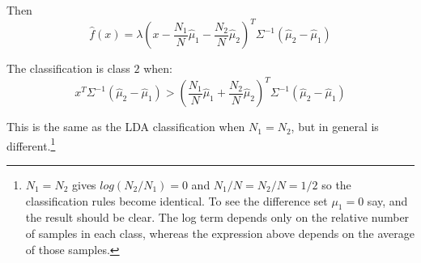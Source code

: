 Then $$\hat{f}(x) = \lambda \left(x -\frac{N_1}{N} \hat{\mu}_1 - \frac{N_2}{N} \hat{\mu}_2\right)^T \Sigma^{-1} \left(\hat{\mu}_2 - \hat{\mu}_1 \right)$$

The classification is class $2$ when:
$$x^T \Sigma^{-1} \left(\hat{\mu}_2 - \hat{\mu}_1 \right) > \left(\frac{N_1}{N} \hat{\mu}_1 + \frac{N_2}{N} \hat{\mu}_2\right)^T \Sigma^{-1} \left(\hat{\mu}_2 - \hat{\mu}_1 \right)$$

This is the same as the LDA classification when $N_1 = N_2$, but in general is different.\footnote{
$N_1 = N_2$ gives $log (N_2 / N_1) = 0$ and $N_1 / N = N_2 / N = 1/2$ so the classification rules become identical. To see the difference set $\mu_1 = 0$ say, and the result should be clear. The log term depends only on the relative number of samples in each class, whereas the expression above depends on the average of those samples.}